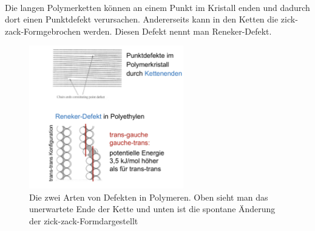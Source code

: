 \documentclass[11pt,a4paper]{article}
\numberwithin{equation}{section}
\numberwithin{figure}{section}
\begin{document}
\\
\begin{addmargin}[25pt]{0pt}   
Die langen Polymerketten können an einem Punkt im Kristall enden und dadurch dort einen Punktdefekt verursachen. Andererseits kann in den Ketten die \glqq zick-zack-Form\grqq gebrochen werden. Diesen Defekt nennt man Reneker-Defekt.
\begin{figure}[h]
    \centering
    \includegraphics[width = 0.6\textwidth]{images/Materialwissenschaften/Polymerdefekte.jpeg}
    \caption{Die zwei Arten von Defekten in Polymeren. Oben sieht man das unerwartete Ende der Kette und unten ist die spontane Änderung der \glqq zick-zack-Form\grqq dargestellt}
    \label{fig:Polymerdefekte}
\end{figure}
\end{addmargin}
\end{document}
